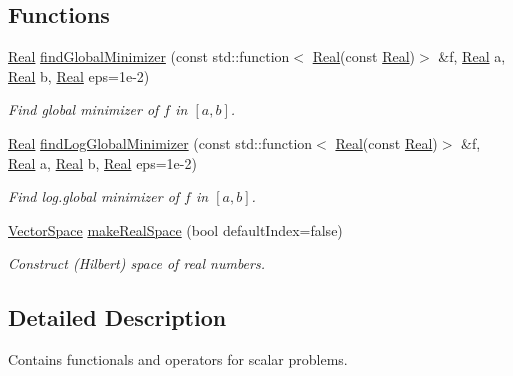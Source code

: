 \subsection*{\-Functions}
\begin{DoxyCompactItemize}
\item 
\hyperlink{classSpacy_1_1Real}{\-Real} \hyperlink{namespaceSpacy_1_1Scalar_ae3d9bbc5d6c84eafb70737dd8a96251c}{find\-Global\-Minimizer} (const std\-::function$<$ \hyperlink{classSpacy_1_1Real}{\-Real}(const \hyperlink{classSpacy_1_1Real}{\-Real})$>$ \&f, \hyperlink{classSpacy_1_1Real}{\-Real} a, \hyperlink{classSpacy_1_1Real}{\-Real} b, \hyperlink{classSpacy_1_1Real}{\-Real} eps=1e-\/2)
\begin{DoxyCompactList}\small\item\em \-Find global minimizer of $f$ in $[a,b]$. \end{DoxyCompactList}\item 
\hyperlink{classSpacy_1_1Real}{\-Real} \hyperlink{namespaceSpacy_1_1Scalar_a4692ea99ec81e957a20415d52659fd42}{find\-Log\-Global\-Minimizer} (const std\-::function$<$ \hyperlink{classSpacy_1_1Real}{\-Real}(const \hyperlink{classSpacy_1_1Real}{\-Real})$>$ \&f, \hyperlink{classSpacy_1_1Real}{\-Real} a, \hyperlink{classSpacy_1_1Real}{\-Real} b, \hyperlink{classSpacy_1_1Real}{\-Real} eps=1e-\/2)
\begin{DoxyCompactList}\small\item\em \-Find log.\-global minimizer of $f$ in $[a,b]$. \end{DoxyCompactList}\item 
\hyperlink{classSpacy_1_1VectorSpace}{\-Vector\-Space} \hyperlink{group__ScalarGroup_ga4aee33d5bdac18829c25077f47db44f3}{make\-Real\-Space} (bool default\-Index=false)
\begin{DoxyCompactList}\small\item\em \-Construct (\-Hilbert) space of real numbers. \end{DoxyCompactList}\end{DoxyCompactItemize}


\subsection{\-Detailed \-Description}
\-Contains functionals and operators for scalar problems. 

